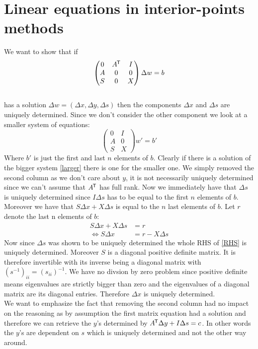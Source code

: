 \documentclass{article}
\newcommand*{\tran}{^{\mkern-1.5mu\mathsf{T}}}%
\begin{document}
	\clearpage
	
	\section{Linear equations in interior-points methods}
	
	We want to show that if 
	\begin{equation}\label{larger}
		\begin{pmatrix} 0&A\tran&I \\ A&0&0 \\ S&0&X \end{pmatrix} \Delta w = b
	\end{equation}\\
	has a solution $\Delta w = (\Delta x, \Delta y, \Delta s)$ then the components $\Delta x$ and $\Delta s$ are uniquely determined. Since we don't consider the other component we look at a smaller system of equations:
	\begin{equation}
		\begin{pmatrix} 0&I \\ A&0 \\ S&X \end{pmatrix} w' = b' 
	\end{equation}
	Where $b'$ is just the first and last $n$ elements of $b$. Clearly if there is a solution of the bigger system \ref{larger} there is one for the smaller one. We simply removed the second column as we don't care about $y$, it is not necessarily uniquely determined since we can't assume that $A\tran$ has full rank. Now we immediately have that $ \Delta s$ is uniquely determined since $I \Delta s $ has to be equal to the first $n$ elements of $b$. Moreover we have that $S \Delta x + X \Delta s$ is equal to the $n$ last elements of $b$. Let $r$ denote the last n elements of $b$:
	\begin{align}
		S \Delta x + X \Delta s &= r\\
		\iff S \Delta x &= r - X \Delta s \label{RHS}
	\end{align}
	Now since $\Delta s$ was shown to be uniquely determined the whole RHS of \ref{RHS} is uniquely determined. Moreover $S$ is a diagonal positive definite matrix. It is therefore invertible with its inverse being a diagonal matrix with $(s^{-1})_{ii} = (s_{ii})^{-1}$. We have no divsion by zero problem since positive definite means eigenvalues are strictly bigger than zero and the eigenvalues of a diagonal matrix are its diagonal entries. Therefore $\Delta x$ is uniquely determined. \\
	We want to emphasize the fact that removing the second column had no impact on the reasoning as by assumption the first matrix equation had a solution and therefore we can retrieve the $y$'s determined by $A\tran \Delta y + I\Delta s = c$. In other words the $y$'s are dependent on $s$ which is uniquely determined and not the other way around.
	
\end{document}
